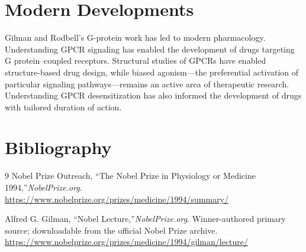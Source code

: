 \section{Modern Developments}

Gilman and Rodbell's G-protein work has led to modern pharmacology. Understanding GPCR signaling has enabled the development of drugs targeting G protein--coupled receptors. Structural studies of GPCRs have enabled structure-based drug design, while biased agonism---the preferential activation of particular signaling pathways---remains an active area of therapeutic research. Understanding GPCR desensitization has also informed the development of drugs with tailored duration of action.


\section{Bibliography}

\begin{thebibliography}{9}
Nobel Prize Outreach, ``The Nobel Prize in Physiology or Medicine 1994,''\emph{NobelPrize.org}.\\
\url{https://www.nobelprize.org/prizes/medicine/1994/summary/}

Alfred G. Gilman, ``Nobel Lecture,''\emph{NobelPrize.org}. Winner-authored primary source; downloadable from the official Nobel Prize archive.\\
\url{https://www.nobelprize.org/prizes/medicine/1994/gilman/lecture/}
\end{thebibliography}
